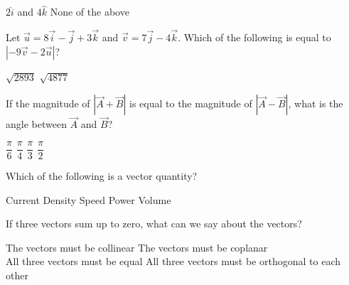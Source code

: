 \documentclass[12pt,addpoints]{exam}
\begin{document}
{{{\begin{questions}
\begin{oneparchoices}
						\choice $2\hat i$ and $4\hat k$
						\choice None of the above
					\end{oneparchoices}
					\question Let $\vec u = 8\vec i - \vec j + 3\vec k$ and $\vec v = 7\vec j - 4\vec k$. Which of the following is equal to $| { - 9\vec v - 2\vec u}|$? \\
					\begin{oneparchoices}
						\choice $\sqrt{2893}$
						\choice $\sqrt{4877}$
					\end{oneparchoices}
					\question If the magnitude of $|\vec{A}+\vec{B}|$ is equal to the magnitude of $|\vec{A}-\vec{B}|$, what is the angle between $\vec{A}$ and $\vec{B}$? \\
					\begin{oneparchoices}
						\choice $\dfrac{\pi}{6}$
						\choice $\dfrac{\pi}{4}$
						\choice $\dfrac{\pi}{3}$
						\choice $\dfrac{\pi}{2}$
					\end{oneparchoices}
					\question Which of the following is a vector quantity? \\
					\begin{oneparchoices}
						\choice Current Density
						\choice Speed
						\choice Power
						\choice Volume
					\end{oneparchoices}
					\question If three vectors sum up to zero, what can we say about the vectors? \\
					\begin{oneparchoices}
						\choice The vectors must be collinear
						\choice The vectors must be coplanar \\
						\choice All three vectors must be equal
						\choice All three vectors must be orthogonal to each other
					\end{oneparchoices}

\end{questions}}}}
\end{document}
